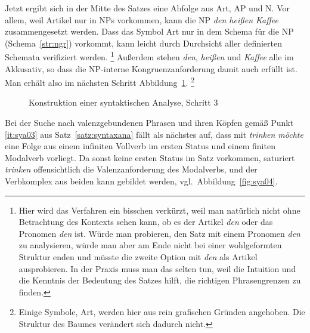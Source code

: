 Jetzt ergibt sich in der Mitte des Satzes eine Abfolge aus Art, AP und N.
Vor allem, weil Artikel nur in NPs vorkommen, kann die NP \textit{den heißen Kaffee} zusammengesetzt werden.
Dass das Symbol Art nur in dem Schema für die NP (Schema~\ref{str:ngr}) vorkommt, kann leicht durch Durchsicht aller definierten Schemata verifiziert werden.%
\footnote{Hier wird das Verfahren ein bisschen verkürzt, weil man natürlich nicht ohne Betrachtung des Kontexts sehen kann, ob es der Artikel \textit{den} oder das Pronomen \textit{den} ist.
Würde man probieren, den Satz mit einem Pronomen \textit{den} zu analysieren, würde man aber am Ende nicht bei einer wohlgeformten Struktur enden und müsste die zweite Option mit \textit{den} als Artikel ausprobieren.
In der Praxis muss man das selten tun, weil die Intuition und die Kenntnis der Bedeutung des Satzes hilft, die richtigen Phrasengrenzen zu finden.}
Außerdem stehen \textit{den}, \textit{heißen} und \textit{Kaffee} alle im Akkusativ, so dass die NP-interne Kongruenzanforderung damit  auch erfüllt ist.
Man erhält also im nächsten Schritt Abbildung~\ref{fig:sya03}.%
\footnote{Einige Symbole, \zB Art, werden hier aus rein grafischen Gründen angehoben.
Die Struktur des Baumes verändert sich dadurch nicht.}

\begin{figure}[!htbp]
  \caption{Konstruktion einer syntaktischen Analyse, Schritt 3}
  \label{fig:sya03}
\end{figure}

Bei der Suche nach valenzgebundenen Phrasen und ihren Köpfen gemäß Punkt \ref{it:sya03} aus Satz~\ref{satz:syntaxana} fällt als nächstes auf, dass mit \textit{trinken möchte} eine Folge aus einem infiniten Vollverb im ersten Status und einem finiten Modalverb vorliegt.
Da sonst keine ersten Status im Satz vorkommen, saturiert \textit{trinken} offensichtlich die Valenzanforderung des Modalverbs, und der Verbkomplex aus beiden kann gebildet werden, vgl.\ Abbildung~\ref{fig:sya04}.

